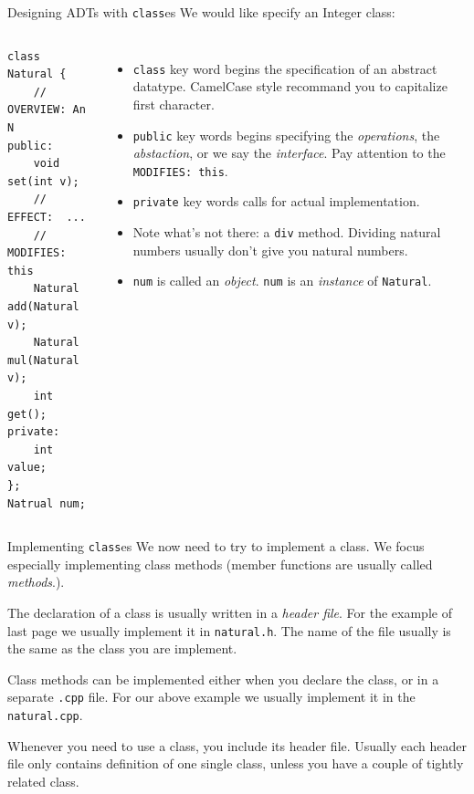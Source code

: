\begin{frame}[fragile]{Designing ADTs with \texttt{class}es}
We would like specify an Integer class:
\begin{columns}[]

\vspace{-.2in}
\begin{verbatim}
class Natural {
    // OVERVIEW: An N
public:
    void  set(int v);
    // EFFECT:  ...
    // MODIFIES: this
    Natural  add(Natural v);
    Natural  mul(Natural v);
    int get();
private:
    int value;
};
Natrual num;
\end{verbatim}

\vspace{-.2in}
\begin{itemize}
	\small
	\item \texttt{class} key word begins the specification of an abstract datatype. CamelCase style recommand you to capitalize first character.
	\item \texttt{public} key words begins specifying the \textit{operations}, the \textit{abstaction}, or we say the \textit{interface}. Pay attention to the \texttt{MODIFIES: this}.
	\item \texttt{private} key words calls for actual implementation.
	\item Note what's not there: a \texttt{div} method. Dividing natural numbers usually don't give you natural numbers.
	\item \texttt{num} is called an \textit{object}. \texttt{num} is an \textit{instance} of \texttt{Natural}. 
\end{itemize}
\end{columns}
\end{frame}

\begin{frame}{Implementing \texttt{class}es}
We now need to try to implement a class. We focus especially implementing class methods (member functions are usually called \textit{methods}.). 

\vspace{0.1in}
The declaration of a class is usually written in a \textit{header file}. For the example of last page we usually implement it in \texttt{natural.h}. The name of the file usually is the same as the class you are implement.  

\vspace{0.1in}
Class methods can be implemented either when you declare the class, or in a separate \texttt{.cpp} file. For our above example we usually implement it in the \texttt{natural.cpp}.

\vspace{0.1in}
Whenever you need to use a class, you include its header file. Usually each header file only contains definition of one single class, unless you have a couple of tightly related class. 
\end{frame}

